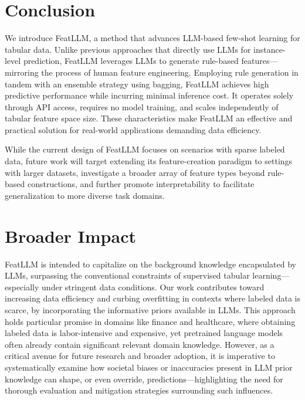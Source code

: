 \section{Conclusion}
We introduce \textsf{FeatLLM}, a method that advances LLM-based few-shot learning for tabular data. Unlike previous approaches that directly use LLMs for instance-level prediction, \textsf{FeatLLM} leverages LLMs to generate rule-based features—mirroring the process of human feature engineering. Employing rule generation in tandem with an ensemble strategy using bagging, \textsf{FeatLLM} achieves high predictive performance while incurring minimal inference cost. It operates solely through API access, requires no model training, and scales independently of tabular feature space size. These characteristics make \textsf{FeatLLM} an effective and practical solution for real-world applications demanding data efficiency.

While the current design of \textsf{FeatLLM} focuses on scenarios with sparse labeled data, future work will target extending its feature-creation paradigm to settings with larger datasets, investigate a broader array of feature types beyond rule-based constructions, and further promote interpretability to facilitate generalization to more diverse task domains.

\section{Broader Impact}
\textsf{FeatLLM} is intended to capitalize on the background knowledge encapsulated by LLMs, surpassing the conventional constraints of supervised tabular learning—especially under stringent data conditions. Our work contributes toward increasing data efficiency and curbing overfitting in contexts where labeled data is scarce, by incorporating the informative priors available in LLMs. This approach holds particular promise in domains like finance and healthcare, where obtaining labeled data is labor-intensive and expensive, yet pretrained language models often already contain significant relevant domain knowledge. However, as a critical avenue for future research and broader adoption, it is imperative to systematically examine how societal biases or inaccuracies present in LLM prior knowledge can shape, or even override, predictions—highlighting the need for thorough evaluation and mitigation strategies surrounding such influences.

